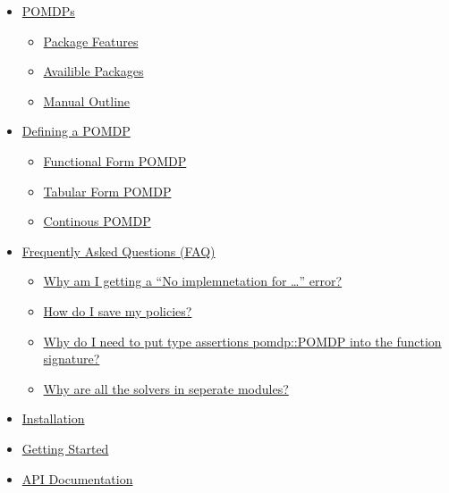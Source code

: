 \documentclass[12pt,]{article}
\providecommand{\tightlist}{%
  \setlength{\itemsep}{0pt}\setlength{\parskip}{0pt}}
\begin{document}
\begin{itemize}
\tightlist
\item
  \href{index.md\#POMDPs-1}{POMDPs}

  \begin{itemize}
  \tightlist
  \item
    \href{index.md\#Package-Features-1}{Package Features}
  \item
    \href{index.md\#Availible-Packages-1}{Availible Packages}
  \item
    \href{index.md\#Manual-Outline-1}{Manual Outline}
  \end{itemize}
\item
  \href{def_pomdp.md\#Defining-a-POMDP-1}{Defining a POMDP}

  \begin{itemize}
  \tightlist
  \item
    \href{def_pomdp.md\#Functional-Form-POMDP-1}{Functional Form POMDP}
  \item
    \href{def_pomdp.md\#Tabular-Form-POMDP-1}{Tabular Form POMDP}
  \item
    \href{def_pomdp.md\#Continous-POMDP-1}{Continous POMDP}
  \end{itemize}
\item
  \href{faq.md\#Frequently-Asked-Questions-(FAQ)-1}{Frequently Asked
  Questions (FAQ)}

  \begin{itemize}
  \tightlist
  \item
    \href{faq.md\#Why-am-I-getting-a-\%22No-implemnetation-for-...\%22-error?-1}{Why
    am I getting a ``No implemnetation for \ldots{}'' error?}
  \item
    \href{faq.md\#How-do-I-save-my-policies?-1}{How do I save my
    policies?}
  \item
    \href{faq.md\#Why-do-I-need-to-put-type-assertions-pomdp::POMDP-into-the-function-signature?-1}{Why
    do I need to put type assertions pomdp::POMDP into the function
    signature?}
  \item
    \href{faq.md\#Why-are-all-the-solvers-in-seperate-modules?-1}{Why
    are all the solvers in seperate modules?}
  \end{itemize}
\item
  \href{install.md\#Installation-1}{Installation}
\item
  \href{get_started.md\#Getting-Started-1}{Getting Started}
\item
  \href{api.md\#API-Documentation-1}{API Documentation}


\end{itemize}
\end{document}
